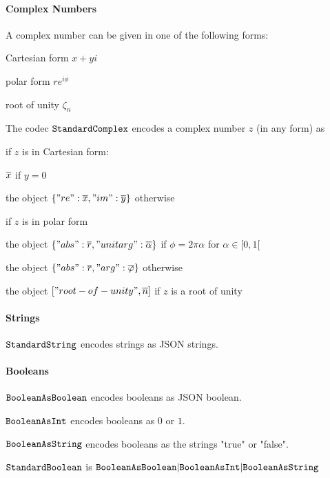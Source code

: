 \paragraph{Complex Numbers}
A complex number can be given in one of the following forms:
\begin{compactitem}
 \item Cartesian form $x+yi$
 \item polar form $r e^{i\phi}$
 \item root of unity $\zeta_n$
\end{compactitem}

The codec $\cn{StandardComplex}$ encodes a complex number $z$ (in any form) as
\begin{compactitem}
 \item if $z$ is in Cartesian form:
  \begin{compactitem}
    \item $\ov{x}$ if $y=0$
    \item the object $\jobj{"re": \ov{x}, "im":\ov{y}}$ otherwise
  \end{compactitem}
 \item if $z$ is in polar form
  \begin{compactitem}
   \item the object $\jobj{"abs": \ov{r}, "unitarg": \ov{\alpha}}$ if $\phi=2\pi \alpha$ for $\alpha\in[0,1[$
   \item the object $\jobj{"abs": \ov{r}, "arg": \ov{\phi}}$ otherwise
  \end{compactitem}
 \item the object $["root-of-unity", \ov{n}]$ if $z$ is a root of unity
\end{compactitem}

\paragraph{Strings}
$\cn{StandardString}$ encodes strings as JSON strings.

\paragraph{Booleans}
$\cn{BooleanAsBoolean}$ encodes booleans as JSON boolean.

$\cn{BooleanAsInt}$ encodes booleans as $0$ or $1$.

$\cn{BooleanAsString}$ encodes booleans as the strings "true" or "false".

$\cn{StandardBoolean}$ is $\cunion{\cn{BooleanAsBoolean},\cn{BooleanAsInt},\cn{BooleanAsString}}$


